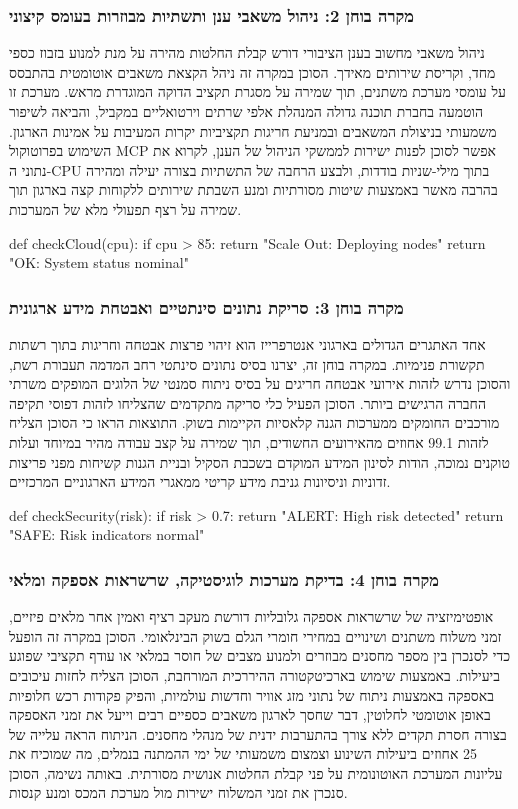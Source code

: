 \documentclass{hebrew-academic-template}
\begin{document}
\subsubsection{מקרה בוחן 2: ניהול משאבי ענן ותשתיות מבוזרות בעומס קיצוני}
ניהול משאבי מחשוב בענן הציבורי דורש קבלת החלטות מהירה על מנת למנוע בזבוז כספי מחד, וקריסת שירותים מאידך. הסוכן במקרה זה ניהל הקצאת משאבים אוטומטית בהתבסס על עומסי מערכת משתנים, תוך שמירה על מסגרת תקציב הדוקה המוגדרת מראש. מערכת זו הוטמעה בחברת תוכנה גדולה המנהלת אלפי שרתים וירטואליים במקביל, והביאה לשיפור משמעותי בניצולת המשאבים ובמניעת חריגות תקציביות יקרות המעיבות על אמינות הארגון. השימוש בפרוטוקול MCP אפשר לסוכן לפנות ישירות לממשקי הניהול של הענן, לקרוא את נתוני ה-CPU בתוך מילי-שניות בודדות, ולבצע הרחבה של התשתיות בצורה יעילה ומהירה בהרבה מאשר באמצעות שיטות מסורתיות ומנע השבתת שירותים ללקוחות קצה בארגון תוך שמירה על רצף תפעולי מלא של המערכות.
\begin{pythonbox}
def checkCloud(cpu):
    if cpu > 85:
        return "Scale Out: Deploying nodes"
    return "OK: System status nominal"
\end{pythonbox}

\subsubsection{מקרה בוחן 3: סריקת נתונים סינתטיים ואבטחת מידע ארגונית}
אחד האתגרים הגדולים בארגוני אנטרפרייז הוא זיהוי פרצות אבטחה וחריגות בתוך רשתות תקשורת פנימיות. במקרה בוחן זה, יצרנו בסיס נתונים סינתטי רחב המדמה תעבורת רשת, והסוכן נדרש לזהות אירועי אבטחה חריגים על בסיס ניתוח סמנטי של הלוגים המופקים משרתי החברה הרגישים ביותר. הסוכן הפעיל כלי סריקה מתקדמים שהצליחו לזהות דפוסי תקיפה מורכבים החומקים ממערכות הגנה קלאסיות הקיימות בשוק. התוצאות הראו כי הסוכן הצליח לזהות 99.1 אחוזים מהאירועים החשודים, תוך שמירה על קצב עבודה מהיר במיוחד ועלות טוקנים נמוכה, הודות לסינון המידע המוקדם בשכבת הסקיל ובניית הגנות קשיחות מפני פריצות זדוניות וניסיונות גניבת מידע קריטי ממאגרי המידע הארגוניים המרכזיים.
\begin{pythonbox}
def checkSecurity(risk):
    if risk > 0.7:
        return "ALERT: High risk detected"
    return "SAFE: Risk indicators normal"
\end{pythonbox}

\subsubsection{מקרה בוחן 4: בדיקת מערכות לוגיסטיקה, שרשראות אספקה ומלאי}
אופטימיזציה של שרשראות אספקה גלובליות דורשת מעקב רציף ואמין אחר מלאים פיזיים, זמני משלוח משתנים ושינויים במחירי חומרי הגלם בשוק הבינלאומי. הסוכן במקרה זה הופעל כדי לסנכרן בין מספר מחסנים מבוזרים ולמנוע מצבים של חוסר במלאי או עודף תקציבי שפוגע ביעילות. באמצעות שימוש בארכיטקטורה ההיררכית המורחבת, הסוכן הצליח לחזות עיכובים באספקה באמצעות ניתוח של נתוני מזג אוויר וחדשות עולמיות, והפיק פקודות רכש חלופיות באופן אוטומטי לחלוטין, דבר שחסך לארגון משאבים כספיים רבים וייעל את זמני האספקה בצורה חסרת תקדים ללא צורך בהתערבות ידנית של מנהלי מחסנים. הניתוח הראה עלייה של 25 אחוזים ביעילות השינוע וצמצום משמעותי של ימי ההמתנה בנמלים, מה שמוכיח את עליונות המערכת האוטונומית על פני קבלת החלטות אנושית מסורתית. באותה נשימה, הסוכן סנכרן את זמני המשלוח ישירות מול מערכת המכס ומנע קנסות.
\end{document}
